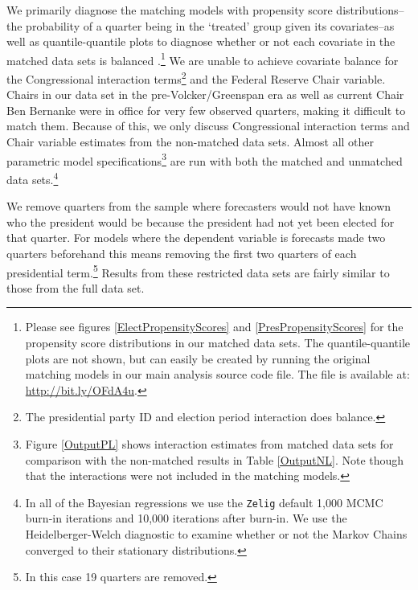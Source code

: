 \documentclass[a4paper]{article}\usepackage{graphicx, color}
\begin{document}
We primarily diagnose the matching models with propensity score distributions--the probability of a quarter being in the `treated' group given its covariates--as well as quantile-quantile plots to diagnose whether or not each covariate in the matched data sets is balanced \citep{Ho2007}.\footnote{Please see figures \ref{ElectPropensityScores} and \ref{PresPropensityScores} for the propensity score distributions in our matched data sets. The quantile-quantile plots are not shown, but can easily be created by running the original matching models in our main analysis source code file. The file is available at: \url{http://bit.ly/OFdA4u}.}  We are unable to achieve covariate balance for the Congressional interaction terms\footnote{The presidential party ID and election period interaction does balance.} and the Federal Reserve Chair variable. Chairs in our data set in the pre-Volcker/Greenspan era as well as current Chair Ben Bernanke were in office for very few observed quarters, making it difficult to match them. Because of this, we only discuss Congressional interaction terms and Chair variable estimates from the non-matched data sets. Almost all other parametric model specifications\footnote{Figure \ref{OutputPL} shows interaction estimates from matched data sets for comparison with the non-matched results in Table \ref{OutputNL}. Note though that the interactions were not included in the matching models.} are run with both the matched and unmatched data sets.\footnote{In all of the Bayesian regressions we use the {\tt{Zelig}} default 1,000 MCMC burn-in iterations and 10,000 iterations after burn-in. We use the Heidelberger-Welch diagnostic to examine whether or not the Markov Chains converged to their stationary distributions.}

We remove quarters from the sample where forecasters would not have known who the president would be because the president had not yet been elected for that quarter. For models where the dependent variable is forecasts made two quarters beforehand this means removing the first two quarters of each presidential term.\footnote{In this case 19 quarters are removed.} Results from these restricted data sets are fairly similar to those from the full data set.
\end{document}
